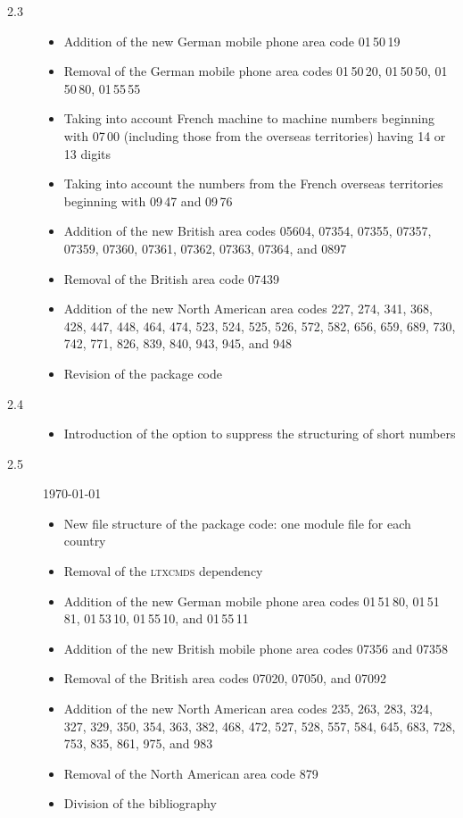 \documentclass[numbers=noenddot]{scrreprt}
\newcommand*\Paket[1]{\textsc{#1}}
\begin{document}
\begin{description}
\begin{itemize}
\end{itemize}
\item[2.3] 
\begin{itemize}
\item Addition of the new German mobile phone area code 01\,50\,19
\item Removal of the German mobile phone area codes 01\,50\,20, 01\,50\,50, 01\,50\,80, 01\,55\,55
\item Taking into account French machine to machine numbers beginning with 07\,00 (including those from the overseas territories) having 14 or 13 digits
\item Taking into account the numbers from the French overseas territories beginning with 09\,47 and 09\,76
\item Addition of the new British area codes 05604, 07354, 07355, 07357, 07359, 07360, 07361, 07362, 07363, 07364, and 0897
\item Removal of the British area code 07439
\item Addition of the new North American area codes 227, 274, 341, 368, 428, 447, 448, 464, 474, 523, 524, 525, 526, 572, 582, 656, 659, 689, 730, 742, 771, 826, 839, 840, 943, 945, and 948
\item Revision of the package code
\end{itemize}
\item[2.4] 
\begin{itemize}
\item Introduction of the
 option to suppress the structuring of short numbers
\end{itemize}
\item[2.5] \today
\begin{itemize}
\item New file structure of the package code: one module file for each country
\item Removal of the \Paket{ltxcmds} dependency
\item Addition of the new German mobile phone area codes 01\,51\,80, 01\,51\,81, 01\,53\,10, 01\,55\,10, and 01\,55\,11
\item Addition of the new British mobile phone area codes 07356 and 07358
\item Removal of the British area codes 07020, 07050, and 07092
\item Addition of the new North American area codes 235, 263, 283, 324, 327, 329, 350, 354, 363, 382, 468, 472, 527, 528, 557, 584, 645, 683, 728, 753, 835, 861, 975, and 983
\item Removal of the North American area code 879
\item Division of the bibliography
\end{itemize}
\end{description}
\end{document}
